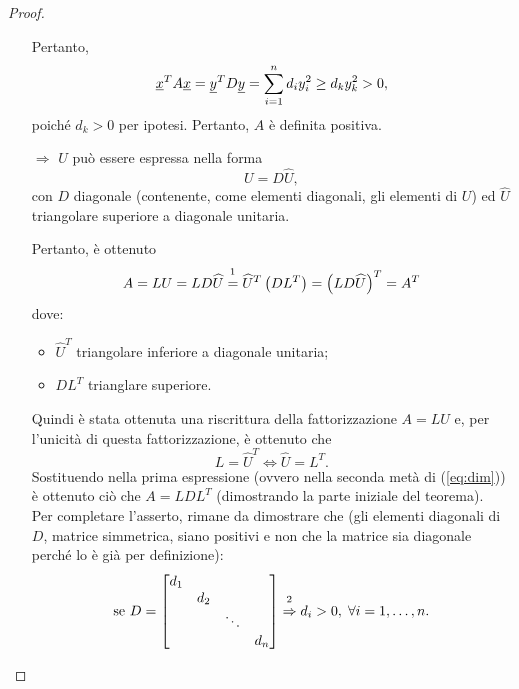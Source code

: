 \begin{proof}
\begin{itemize}
        Pertanto,
        \begin{equation*}
            \uline x^T A\uline x=\uline y^T D\uline y=\sum_{i=1}^nd_i y_i^2\geq d_ky_k^2>0,
        \end{equation*}
        poiché $d_k>0$ per ipotesi. Pertanto, $A$ è definita positiva.
        \item[$\Rightarrow$] $U$ può essere espressa nella forma
        \begin{equation*}
            U=D\widehat U,
        \end{equation*}
        con $D$ diagonale (contenente, come elementi diagonali, gli elementi di $U$) ed $\widehat U$ triangolare superiore a diagonale unitaria.
        
        Pertanto, è ottenuto
        \begin{equation}\label{eq:dim}
            A = LU= LD\widehat U \overset{\footnotemark}{=} \widehat U^T\left(D L^T\right) = \left(LD\widehat U\right)^T = A^T
        \end{equation}
        dove:
        \begin{itemize}
            \item $\widehat U^T$ triangolare inferiore a diagonale unitaria;
            \item $DL^T$ trianglare superiore.
        \end{itemize}
        Quindi è stata ottenuta una riscrittura della fattorizzazione $A=LU$ e, per l'unicità di questa fattorizzazione, è ottenuto che
        \begin{equation*}
            L=\widehat U^T\iff \widehat U=L^T.
        \end{equation*}
        Sostituendo nella prima espressione (ovvero nella seconda metà di (\ref{eq:dim})) è ottenuto ciò che $A=LDL^T$ (dimostrando la parte iniziale del teorema).\\
        Per completare l'asserto, rimane da dimostrare che (gli elementi diagonali di $D$, matrice simmetrica, siano positivi e non che la matrice sia diagonale perché lo è già per definizione):
        \begin{equation*}
            \text{se } D=
            \begin{bmatrix}
                d_1 \\
                & d_2\\
                & & \ddots \\
                & & & d_n
          \end{bmatrix}\overset{\footnotemark}{\Rightarrow} d_i>0,\; \forall i = 1,\hdots,n.
        \end{equation*}
        

\end{itemize}
\end{proof}

